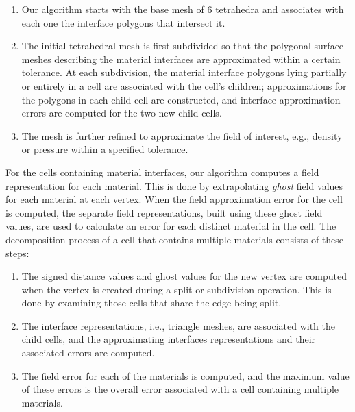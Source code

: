 \documentclass{siggraph}
\begin{document}
\begin{enumerate}
\item Our algorithm starts with the base mesh of 6 tetrahedra and
associates with each one the interface polygons that intersect it.


\item The initial tetrahedral mesh is first subdivided so that the
polygonal surface meshes describing the material interfaces are
approximated within a certain tolerance.  At each subdivision, the
material interface polygons lying partially or entirely in a cell are
associated with the cell's children; approximations for the polygons
in each child cell are constructed, and interface approximation errors
are computed for the two new child cells.


\item The mesh is further refined to approximate the field of
interest, e.g., density or pressure within a specified tolerance.


\end{enumerate}


For the cells containing material interfaces, our algorithm computes a
field representation for each material.  This is done by extrapolating
{\it{ghost}} field values for each material at each vertex.  When the
field approximation error for the cell is computed, the separate field
representations, built using these ghost field values, are used to
calculate an error for each distinct material in the cell.  The
decomposition process of a cell that contains multiple materials
consists of these steps:


\begin{enumerate}


\item The signed distance values and ghost values for the new vertex are computed when 
the vertex is created during a split or subdivision operation.  This is done by 
examining those cells that share the edge being split.


\item The interface representations, i.e., triangle meshes, are associated with the child cells,
and the approximating interfaces representations and their associated errors are computed.


\item The field error for each of the materials is computed, and the maximum value of these errors is the
overall error associated with a cell containing multiple materials.


\end{enumerate}
\end{document}
